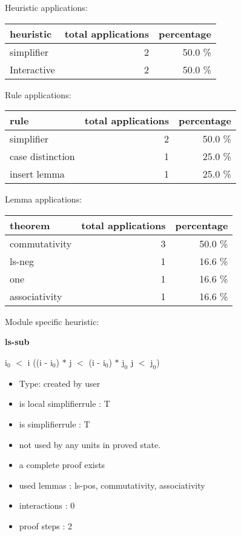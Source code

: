\documentclass[a4paper]{article}
\begin{document}
\medskip


Heuristic applications:

\begin{supertabular}{l|r|r}
heuristic	& total applications & percentage \\ \hline
simplifier & 2 & 50.0 \% \\
Interactive & 2 & 50.0 \% \\

\end{supertabular}

Rule applications:

\begin{supertabular}{l|r|r}
rule	        & total applications & percentage \\ \hline
simplifier & 2 & 50.0 \% \\
case distinction & 1 & 25.0 \% \\
insert lemma & 1 & 25.0 \% \\

\end{supertabular}

Lemma applications:

\begin{supertabular}{l|r|r}
theorem	        & total applications & percentage \\ \hline
commutativity & 3 & 50.0 \% \\
ls-neg & 1 & 16.6 \% \\
one & 1 & 16.6 \% \\
associativity & 1 & 16.6 \% \\

\end{supertabular}

Module specific heuristic:

\pagebreak

{\LARGE\bf ls-sub}\label{lemma-ls-sub}

\medskip

 \Fol $\mbox{i}_{0}$ $<$ i \Imp ((i - $\mbox{i}_{0}$) $*$ j $<$ (i - $\mbox{i}_{0}$) $*$ $\mbox{j}_{0}$ \Equiv j $<$ $\mbox{j}_{0}$)

\begin{itemize}

\item Type: created by user

\item is local simplifierrule : T
\item is simplifierrule : T
\item not used by any units in proved state.
\item       a complete proof exists
\item       used lemmas  : ls-pos, commutativity, associativity
\item       interactions : 0
\item       proof steps  : 2
\end{itemize}
\end{document}
